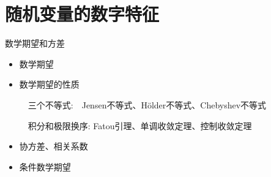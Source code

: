 \section{随机变量的数字特征}
    
    \frame{\sectionpage}
    
    \begin{frame}{数学期望和方差}
    \begin{itemize}
    	\item 数学期望
    	\item 数学期望的性质
    	
    		$\quad$三个不等式:$\quad$Jensen不等式、Hölder不等式、Chebyshev不等式
    	
    		$\quad$积分和极限换序: Fatou引理、单调收敛定理、控制收敛定理
    	\item 协方差、相关系数
    	\item 条件数学期望
    \end{itemize}
    \end{frame}
    